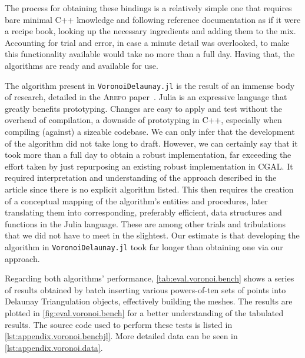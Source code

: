 The process for obtaining these bindings is a relatively simple one that
requires bare minimal C++ knowledge and following reference documentation as if
it were a recipe book, looking up the necessary ingredients and adding them to
the mix.  Accounting for trial and error, in case a minute detail was
overlooked, to make this functionality available would take no more than a full
day.  Having that, the algorithms are ready and available for use.

The algorithm present in \texttt{VoronoiDelaunay.jl} is the result of an immense
body of research, detailed in the \textsc{Arepo}
paper~\cite{Springel:2010:GCHSMM}.  Julia is an expressive language that greatly
benefits prototyping.  Changes are easy to apply and test without the overhead
of compilation, a downside of prototyping in C++, especially when compiling
(against) a sizeable codebase.  We can only infer that the development of the
algorithm did not take long to draft.  However, we can certainly say that it
took more than a full day to obtain a robust implementation, far exceeding the
effort taken by just repurposing an existing robust implementation in \ac{CGAL}.
It required interpretation and understanding of the approach described in the
article since there is no explicit algorithm listed.  This then requires the
creation of a conceptual mapping of the algorithm's entities and procedures,
later translating them into corresponding, preferably efficient, data structures
and functions in the Julia language.  These are among other trials and
tribulations that we did not have to meet in the slightest.  Our estimate is
that developing the algorithm in \texttt{VoronoiDelaunay.jl} took far longer
than obtaining one via our approach.

Regarding both algorithms' performance, \cref{tab:eval.voronoi.bench} shows a
series of results obtained by batch inserting various powers-of-ten sets of
points into Delaunay Triangulation objects, effectively building the meshes.
The results are plotted in \cref{fig:eval.voronoi.bench} for a better
understanding of the tabulated results.  The source code used to perform these
tests is listed in \cref{lst:appendix.voronoi.benchjl}.  More detailed data can
be seen in \cref{lst:appendix.voronoi.data}.

